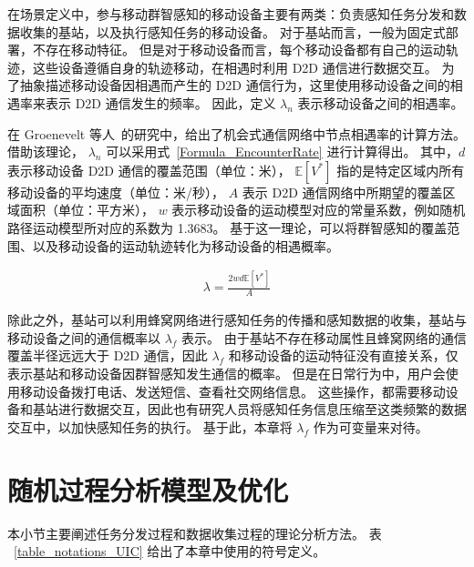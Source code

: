 在场景定义中，参与移动群智感知的移动设备主要有两类：负责感知任务分发和数据收集的基站，以及执行感知任务的移动设备。
对于基站而言，一般为固定式部署，不存在移动特征。
但是对于移动设备而言，每个移动设备都有自己的运动轨迹，这些设备遵循自身的轨迹移动，在相遇时利用 D2D 通信进行数据交互。
为了抽象描述移动设备因相遇而产生的 D2D 通信行为，这里使用移动设备之间的相遇率来表示 D2D 通信发生的频率。
因此，定义 $\lambda_n$ 表示移动设备之间的相遇率。

在 Groenevelt 等人~\cite{DBLP:journals/pe/GroeneveltNK05}的研究中，给出了机会式通信网络中节点相遇率的计算方法。
借助该理论， $\lambda_n$ 可以采用式~\eqref{Formula_EncounterRate} 进行计算得出。
其中，$d$ 表示移动设备 D2D 通信的覆盖范围（单位：米），
$\mathbb{E}[V^*]$ 指的是特定区域内所有移动设备的平均速度（单位：米/秒），
$A$ 表示 D2D 通信网络中所期望的覆盖区域面积（单位：平方米），
$w$ 表示移动设备的运动模型对应的常量系数，例如随机路径运动模型所对应的系数为 1.3683。
基于这一理论，可以将群智感知的覆盖范围、以及移动设备的运动轨迹转化为移动设备的相遇概率。

\vspace{-1em}
\begin{equation}
  \label{Formula_EncounterRate}
  \begin{gathered}
  \lambda = \frac{2 w d \mathbb{E}[V^*]}{A}
  \end{gathered}
\end{equation}

除此之外，基站可以利用蜂窝网络进行感知任务的传播和感知数据的收集，基站与移动设备之间的通信概率以 $\lambda_f$ 表示。
由于基站不存在移动属性且蜂窝网络的通信覆盖半径远远大于 D2D 通信，因此 $\lambda_f$ 和移动设备的运动特征没有直接关系，仅表示基站和移动设备因群智感知发生通信的概率。
但是在日常行为中，用户会使用移动设备拨打电话、发送短信、查看社交网络信息。
这些操作，都需要移动设备和基站进行数据交互，因此也有研究人员将感知任务信息压缩至这类频繁的数据交互中，以加快感知任务的执行。
基于此，本章将 $\lambda_f$ 作为可变量来对待。


\section{随机过程分析模型及优化}
本小节主要阐述任务分发过程和数据收集过程的理论分析方法。
表 ~\ref{table_notations_UIC} 给出了本章中使用的符号定义。


